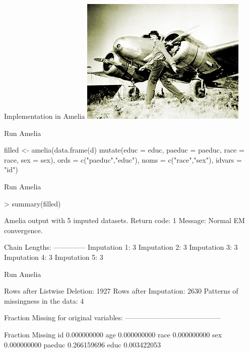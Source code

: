 \documentclass{beamer}
\begin{document}
\begin{frame}{Implementation in Amelia}
\centering\includegraphics[width = .9\textwidth]{figs/amelia}
\end{frame}

\begin{frame}[fragile]{Run Amelia}
\small
\begin{semiverbatim}
filled <- amelia(data.frame(d) %
                   mutate(educ = educ,
                          paeduc = paeduc,
                          race = race,
                          sex = sex),
                 ords = c("paeduc","educ"),
                 noms = c("race","sex"),
                 idvars = "id")
\end{semiverbatim}
\end{frame}

\begin{frame}[fragile]{Run Amelia}
\small
\begin{semiverbatim}
> summary(filled)

Amelia output with 5 imputed datasets.
Return code:  1 
Message:  Normal EM convergence. 

Chain Lengths:
--------------
Imputation 1:  3
Imputation 2:  3
Imputation 3:  3
Imputation 4:  3
Imputation 5:  3
\end{semiverbatim}
\end{frame}

\begin{frame}[fragile]{Run Amelia}
\small
\begin{semiverbatim}
Rows after Listwise Deletion:  1927 
Rows after Imputation:  2630 
Patterns of missingness in the data:  4 

Fraction Missing for original variables: 
-----------------------------------------

       Fraction Missing
id          0.000000000
age         0.000000000
race        0.000000000
sex         0.000000000
paeduc      0.266159696
educ        0.003422053
\end{semiverbatim}
\end{frame}
\end{document}
